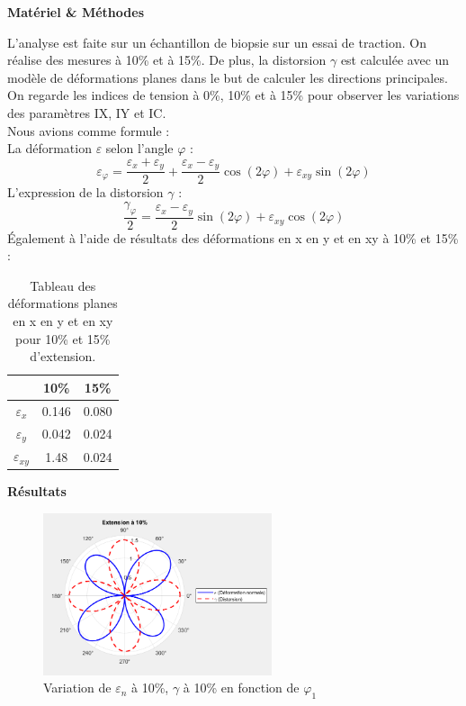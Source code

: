 \documentclass[a4paper,12pt]{article}
\begin{document}
\begin{center}
	\textbf{Matériel \& Méthodes}
\end{center}
L'analyse est faite sur un échantillon de biopsie sur un essai de traction. On réalise des mesures à 10\% et à 15\%. De plus, la distorsion $\gamma$ est calculée avec un modèle de déformations planes dans le but de calculer les directions principales. On regarde les indices de tension à 0\%, 10\% et à 15\% pour observer les variations des paramètres IX, IY et IC.
\bigskip
\\
Nous avions comme formule :\\
La déformation $\varepsilon$ selon l'angle $\varphi$ :
\begin{equation}
	\varepsilon_\varphi = \frac{\varepsilon_x + \varepsilon_y}{2} + \frac{\varepsilon_x - \varepsilon_y}{2} \cos(2\varphi) + \varepsilon_{xy} \sin(2\varphi)
	\label{eq:10}
\end{equation}
L'expression de la distorsion $\gamma$ :
\begin{equation}
	\frac{\gamma_\varphi}{2} = \frac{\varepsilon_x - \varepsilon_y}{2} \sin(2\varphi) + \varepsilon_{xy} \cos(2\varphi)
	\label{eq:11}
\end{equation}
Également à l'aide de résultats des déformations en x en y et en xy à 10\% et 15\% :\\


\begin{table}[h!]
	\centering
	\begin{tabular}{|c|c|c|}
		\hline
		& 10\% & 15\%  \\
		\hline
		$\varepsilon_x$     & 0.146  & 0.080  \\
		$\varepsilon_y$     & 0.042  & 0.024   \\
		$\varepsilon_{xy}$     & 1.48  & 0.024   \\
		\hline
	\end{tabular}
	\caption{Tableau des déformations planes en x en y et en xy pour 10\% et 15\% d'extension.}
	\label{tab:entetes}
\end{table}
\clearpage

\begin{center}
	\textbf{Résultats}
\end{center}

\begin{figure}[H] 
	\centering
	\includegraphics[width=0.6\textwidth]{biop4.png} 
	\caption{Variation de $\varepsilon_n$ à 10\%, $\gamma$ à 10\% en fonction de $\varphi_1$} 
	\label{fig:mon_image13} 
\end{figure}
\end{document}

